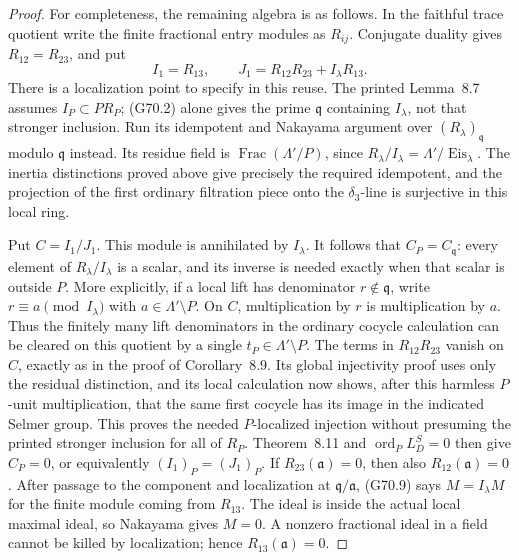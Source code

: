 \begin{proof}
For completeness, the remaining algebra is as follows.
In the faithful trace quotient write the finite fractional
entry modules as $R_{ij}$.  Conjugate duality gives
$R_{12}=R_{23}$, and put
\[
 I_1=R_{13},\qquad J_1=R_{12}R_{23}+I_\lambda R_{13}.
                                                        \tag{G70.9}
\]
There is a localization point to specify in this reuse.
The printed Lemma~8.7 assumes $I_P\subset P R_P$;
(G70.2) alone gives the prime $\mathfrak q$ containing
$I_\lambda$, not that stronger inclusion.
Run its idempotent and Nakayama argument over
$(R_\lambda)_{\mathfrak q}$ modulo $\mathfrak q$ instead.
Its residue field is $\operatorname{Frac}(\Lambda'/P)$,
since $R_\lambda/I_\lambda=\Lambda'/\operatorname{Eis}_\lambda$.
The inertia distinctions proved above give precisely the
required idempotent, and the projection of the first
ordinary filtration piece onto the $\delta_3$-line is
surjective in this local ring.

Put $C=I_1/J_1$.  This module is annihilated by
$I_\lambda$.  It follows that $C_P=C_{\mathfrak q}$:
every element of $R_\lambda/I_\lambda$ is a scalar,
and its inverse is needed exactly when that scalar is
outside $P$.  More explicitly, if a local lift has
denominator $r\notin\mathfrak q$, write
$r\equiv a\pmod{I_\lambda}$ with $a\in\Lambda'\setminus P$.
On $C$, multiplication by $r$ is multiplication by $a$.
Thus the finitely many lift denominators in the ordinary
cocycle calculation can be cleared on this quotient by
a single $t_P\in\Lambda'\setminus P$.
The terms in $R_{12}R_{23}$ vanish on $C$, exactly as in
the proof of Corollary~8.9.  Its global injectivity proof
uses only the residual distinction, and its local
calculation now shows, after this harmless $P$-unit
multiplication, that the same first cocycle has its image
in the indicated Selmer group.  This proves the needed
$P$-localized injection without presuming the printed
stronger inclusion for all of $R_P$.
Theorem~8.11 and $\operatorname{ord}_P L_D^S=0$ then give
$C_P=0$, or equivalently $(I_1)_P=(J_1)_P$.
If $R_{23}(\mathfrak a)=0$, then also
$R_{12}(\mathfrak a)=0$.  After passage to the component
and localization at $\mathfrak q/\mathfrak a$, (G70.9)
says $M=I_\lambda M$ for the finite module coming from
$R_{13}$.  The ideal is inside the actual local maximal
ideal, so Nakayama gives $M=0$.  A nonzero fractional
ideal in a field cannot be killed by localization; hence
$R_{13}(\mathfrak a)=0$.


\end{proof}
